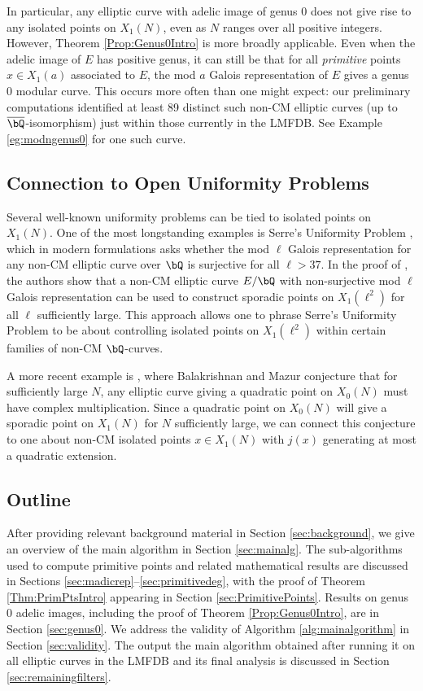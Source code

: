 \documentclass[11pt,reqno]{amsart}
\theoremstyle{plain}
\theoremstyle{definition}
\newcommand{\Q}{\bQ}
\begin{document}
\noindent In particular, any elliptic curve with adelic image of genus 0 does not give rise to any isolated points on $X_1(N)$, even as $N$ ranges over all positive integers. However, Theorem \ref{Prop:Genus0Intro} is more broadly applicable. Even when the adelic image of $E$ has positive genus, it can still be that for all \emph{primitive} points $x \in X_1(a)$ associated to $E$, the mod $a$ Galois representation of $E$ gives a genus 0 modular curve. This occurs more often than one might expect: our preliminary computations identified at least 89 distinct such non-CM elliptic curves (up to $\overline{\Q}$-isomorphism) just within those currently in the LMFDB. See Example \ref{eg:modngenus0} for one such curve.

\subsection{Connection to Open Uniformity Problems}\label{sec:UniformityConnections} Several well-known uniformity problems can be tied to isolated points on $X_1(N)$. One of the most longstanding examples is Serre's Uniformity Problem \cite[\S\,4.3]{serre72}, which in modern formulations \cite{sutherland,ZywinaImages} asks whether the mod $\ell$ Galois representation for any non-CM elliptic curve over $\Q$ is surjective for all $\ell>37$. In the proof of \cite[Theorem~1.3]{BourdonNajman2021}, the authors show that a non-CM elliptic curve $E/\Q$ with non-surjective mod $\ell$ Galois representation can be used to construct sporadic points on $X_1(\ell^2)$ for all $\ell$ sufficiently large. This approach allows one to phrase Serre's Uniformity Problem to be about controlling isolated points on $X_1(\ell^2)$ within certain families of non-CM $\Q$-curves.

A more recent example is \cite[Conjecture 17]{BalakrishnanMazur23}, where Balakrishnan and Mazur conjecture that for sufficiently large $N$, any elliptic curve giving a quadratic point on $X_0(N)$ must have complex multiplication. Since a quadratic point on $X_0(N)$ will give a sporadic point on $X_1(N)$ for $N$ sufficiently large, we can connect this conjecture to one about non-CM isolated points $x \in X_1(N)$ with $j(x)$ generating at most a quadratic extension.

\subsection{Outline}
After providing relevant background material in Section \ref{sec:background}, we give an overview of the main algorithm in Section \ref{sec:mainalg}. The sub-algorithms used to compute primitive points and related mathematical results are discussed in Sections \ref{sec:madicrep}--\ref{sec:primitivedeg}, with the proof of Theorem \ref{Thm:PrimPtsIntro} appearing in Section \ref{sec:PrimitivePoints}. Results on genus 0 adelic images, including the proof of Theorem \ref{Prop:Genus0Intro}, are in Section \ref{sec:genus0}.  We address the validity of Algorithm \ref{alg:mainalgorithm} in Section \ref{sec:validity}. The output the main algorithm obtained after running it on all elliptic curves in the LMFDB and its final analysis is discussed in Section \ref{sec:remainingfilters}.
\end{document}
